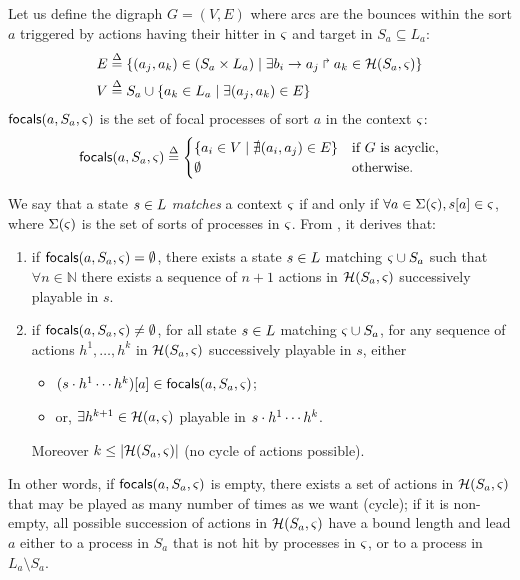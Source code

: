 \begin{definition}\label{def:focals}
Let us define the digraph $G = (V, E)$ where arcs are the bounces within the sort $a$
triggered by actions having their hitter in $\varsigma$ and target in $S_a\subseteq L_a$:
\begin{align*}
E  & \stackrel{\Delta}= \{(a_j,a_k)\in (S_a \times L_a) \mid 
			\exists b_i\rightarrow a_j\Rsh a_k\in \mathcal{H}(S_a,\varsigma) \}
\\
V & \stackrel{\Delta}= S_a \cup \{ a_k\in L_a\mid \exists (a_j,a_k)\in E\}
\end{align*}
$\mathsf{focals}(a,S_a,\varsigma)$ is the set of focal processes of sort $a$ in the context $\varsigma$:
\[
\mathsf{focals}(a,S_a,\varsigma) \stackrel{\Delta}=
\begin{cases}
\{ a_i \in V \mid \nexists (a_i,a_j)\in E\} & \text{if $G$ is acyclic},\\
\emptyset & \text{otherwise.}\\
\end{cases}
\]
\end{definition}

We say that a state $s\in L$ \emph{matches} a context $\varsigma$ if and only if
$\forall a\in\Sigma(\varsigma), {s[a]}\in\varsigma$, where $\Sigma(\varsigma)$ is the set of sorts of
processes in $\varsigma$.
From , it derives that:
\begin{enumerate}
\item if $\mathsf{focals}(a,S_a,\varsigma)=\emptyset$, there exists a 
state $s\in L$ matching $\varsigma\cup S_a$ such that $\forall n\in\mathbb N$ there
exists a sequence of $n+1$ actions in $\mathcal{H}(S_a,\varsigma)$ successively playable in $s$.
\item if $\mathsf{focals}(a,S_a,\varsigma)\neq\emptyset$, for all
state $s\in L$ matching $\varsigma\cup S_a$,
for any sequence of actions $h^1,\dots,h^k$ in $\mathcal{H}(S_a,\varsigma)$ successively playable in $s$,
either
\begin{itemize}
\item $(s\cdot h^1\cdots h^k)[a] \in \mathsf{focals}(a,S_a,\varsigma)$;
\item or, $\exists h^{k+1}\in \mathcal{H}(a,\varsigma)$ playable in $s\cdot h^1\cdots h^k$.
\end{itemize}
Moreover $k\leq|\mathcal{H}(S_a,\varsigma)|$ (no cycle of actions possible).
\end{enumerate}

In other words, if $\mathsf{focals}(a,S_a,\varsigma)$ is empty, there exists a set of actions in
$\mathcal{H}(S_a,\varsigma)$ that may be played as many number of times as we want (cycle);
if it is non-empty, all possible succession of actions in $\mathcal{H}(S_a,\varsigma)$ have a bound length and
lead $a$ either to a process in $S_a$ that is not hit by processes in $\varsigma$, or to a process in
$L_a\setminus S_a$.

